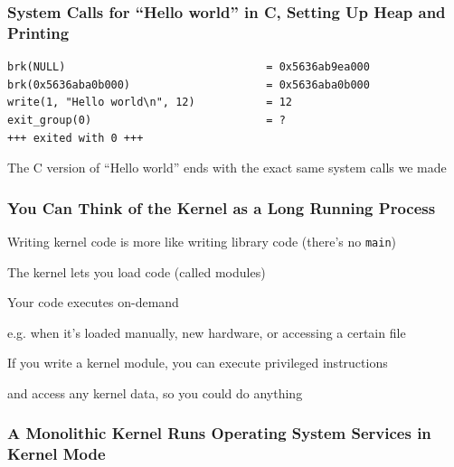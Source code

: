   \begin{frame}[fragile]
    \frametitle{System Calls for ``Hello world'' in C, Setting Up Heap and
                Printing}

    \begin{lstlisting}
brk(NULL)                               = 0x5636ab9ea000
brk(0x5636aba0b000)                     = 0x5636aba0b000
write(1, "Hello world\n", 12)           = 12
exit_group(0)                           = ?
+++ exited with 0 +++
    \end{lstlisting}

    \vspace{1em}
    The C version of ``Hello world'' ends with the exact same system calls we
    made
  \end{frame}

  \begin{frame}
    \frametitle{You Can Think of the Kernel as a Long Running Process}

    Writing kernel code is more like writing library code (there's no \texttt{main})

    \vspace{2em}

    The kernel lets you load code (called modules)

    \vspace{2em}

    Your code executes on-demand

    \hspace{2em} e.g. when it's loaded manually, new hardware, or accessing a certain file

    \vspace{2em}

    If you write a kernel module, you can execute privileged instructions

    \hspace{2em} and access any kernel data, so you could do anything
  \end{frame}

  \begin{frame}
    \frametitle{A Monolithic Kernel Runs Operating System Services in Kernel Mode}

  \end{frame}

